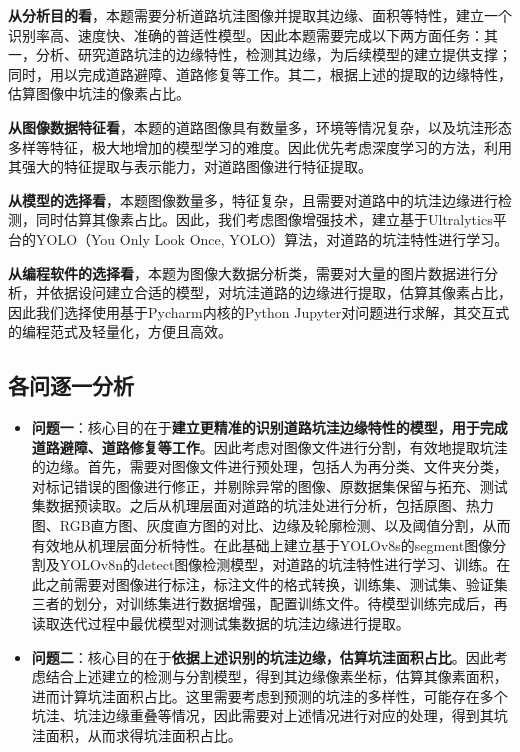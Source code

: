 \documentclass{MathorCupmodeling}
\begin{document}
	\textbf{从分析目的看}，本题需要分析道路坑洼图像并提取其边缘、面积等特性，建立一个识别率高、速度快、准确的普适性模型。因此本题需要完成以下两方面任务：{\heiti 其一}，分析、研究道路坑洼的边缘特性，检测其边缘，为后续模型的建立提供支撑；同时，用以完成道路避障、道路修复等工作。{\heiti 其二}，根据上述的提取的边缘特性，估算图像中坑洼的像素占比。

	\textbf{从图像数据特征看}，本题的道路图像具有数量多，环境等情况复杂，以及坑洼形态多样等特征，极大地增加的模型学习的难度。因此优先考虑深度学习的方法，利用其强大的特征提取与表示能力，对道路图像进行特征提取。

	\textbf{从模型的选择看}，本题图像数量多，特征复杂，且需要对道路中的坑洼边缘进行检测，同时估算其像素占比。因此，我们考虑图像增强技术，建立基于Ultralytics平台的YOLO（You Only Look Once, YOLO）算法，对道路的坑洼特性进行学习。

	\textbf{从编程软件的选择看}，本题为图像大数据分析类，需要对大量的图片数据进行分析，并依据设问建立合适的模型，对坑洼道路的边缘进行提取，估算其像素占比，因此我们选择使用基于Pycharm内核的Python Jupyter对问题进行求解，其交互式的编程范式及轻量化，方便且高效。
	\subsection{各问逐一分析}
	\begin{itemize}
		\item \textbf{问题一}：核心目的在于\textbf{建立更精准的识别道路坑洼边缘特性的模型，用于完成道路避障、道路修复等工作}。因此考虑对图像文件进行分割，有效地提取坑洼的边缘。首先，需要对图像文件进行预处理，包括人为再分类、文件夹分类，对标记错误的图像进行修正，并剔除异常的图像、原数据集保留与拓充、测试集数据预读取。之后从机理层面对道路的坑洼处进行分析，包括原图、热力图、RGB直方图、灰度直方图的对比、边缘及轮廓检测、以及阈值分割，从而有效地从机理层面分析特性。在此基础上建立基于YOLOv8s的segment图像分割及YOLOv8n的detect图像检测模型，对道路的坑洼特性进行学习、训练。在此之前需要对图像进行标注，标注文件的格式转换，训练集、测试集、验证集三者的划分，对训练集进行数据增强，配置训练文件。待模型训练完成后，再读取迭代过程中最优模型对测试集数据的坑洼边缘进行提取。
		\item \textbf{问题二}：核心目的在于\textbf{依据上述识别的坑洼边缘，估算坑洼面积占比}。因此考虑结合上述建立的检测与分割模型，得到其边缘像素坐标，估算其像素面积，进而计算坑洼面积占比。这里需要考虑到预测的坑洼的多样性，可能存在多个坑洼、坑洼边缘重叠等情况，因此需要对上述情况进行对应的处理，得到其坑洼面积，从而求得坑洼面积占比。
	\end{itemize}
\end{document}
